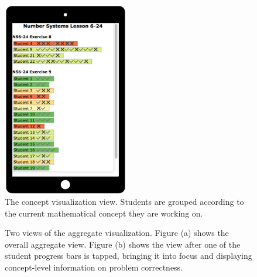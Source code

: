 \documentclass{sigchi}
\begin{document}
\begin{figure}[t]
\centering
\includegraphics[width=55mm]{images/ConceptVisualization.pdf}
\caption{The concept visualization view. Students are grouped according to the current mathematical concept they are working on.}
\label{fig:ConceptVisualization}
\end{figure}

\begin{figure}[t]
\centering
{} \hspace{1em}%
 \hspace{1em}%
\caption{Two views of the aggregate visualization. Figure (a) shows the overall aggregate view. Figure (b) shows the view after one of the student progress bars is tapped, bringing it into focus and displaying concept-level information on problem correctness. }
\label{fig:Spreadsheet}
\end{figure}
\end{document}
